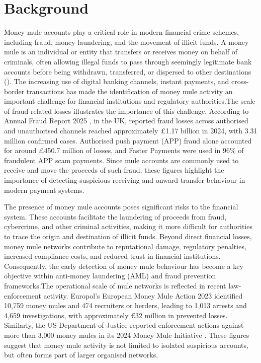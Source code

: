 \chapter{Background}
Money mule accounts play a critical role in modern financial crime schemes, including fraud, money laundering, and the movement of illicit funds. A money mule is an individual or entity that transfers or receives money on behalf of criminals, often allowing illegal funds to pass through seemingly legitimate bank accounts before being withdrawn, transferred, or dispersed to other destinations (\cite{homeoffice2024moneymule}). The increasing use of digital banking channels, instant payments, and cross-border transactions has made the identification of money mule activity an important challenge for financial institutions and regulatory authorities.The scale of fraud-related losses illustrates the importance of this challenge. According to Annual Fraud Report 2025 \cite{ukfinance2025annualfraud}, in the UK,
reported fraud losses across authorised and unauthorised channels reached approximately
\pounds1.17 billion in 2024, with 3.31 million confirmed cases. Authorised push payment
(APP) fraud alone accounted for around \pounds450.7 million of losses, and Faster Payments
were used in 96\% of fraudulent APP scam payments. Since mule accounts are commonly used
to receive and move the proceeds of such fraud, these figures highlight the importance of
detecting suspicious receiving and onward-transfer behaviour in modern payment systems.

The presence of money mule accounts poses significant risks to the financial system. These accounts facilitate the laundering of proceeds from fraud, cybercrime, and other criminal activities, making it more difficult for authorities to trace the origin and destination of illicit funds. Beyond direct financial losses, money mule networks contribute to reputational damage, regulatory penalties, increased compliance costs, and reduced trust in financial institutions. Consequently, the early detection of money mule behaviour has become a key objective within anti-money laundering (AML) and fraud prevention frameworks.The operational scale of mule networks is reflected in recent law-enforcement activity. Europol's
European Money Mule Action 2023 \cite{europol2023papertrail} identified 10,759 money mules and 474 recruiters or herders,
leading to 1,013 arrests and 4,659 investigations, with approximately \euro32 million in
prevented losses. Similarly, the US Department of Justice reported enforcement actions against
more than 3,000 money mules in its 2024 Money Mule Initiative \cite{doj2024moneymules}. These figures suggest that
money mule activity is not limited to isolated suspicious accounts, but often forms part of
larger organised networks.

